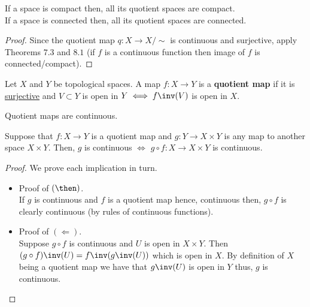 \documentclass[12pt, a4paper]{article}
\begin{document}
\begin{mdprop}
    If a space is compact then, all its quotient spaces are compact. \\
    If a space is connected then, all its quotient spaces are connected.
\end{mdprop}

\begin{proof}
    Since the quotient map \(q : X \to X/\sim\) is continuous and surjective, apply Theorems \(7.3\) and \(8.1\) (if \(f\) is a continuous function then image of \(f\) is connected/compact).
\end{proof}

\begin{definition}
    Let \(X\) and \(Y\) be topological spaces. A map \(f : X \to Y\) is a \textbf{quotient map} if it is \underline{surjective} and \(V \subset Y\) is open in \(Y \iff f\inv(V)\) is open in \(X\).
\end{definition}

\begin{mdremark}
    Quotient maps are continuous.
\end{mdremark}

\begin{mdprop}
    Suppose that \(f : X \to Y\) is a quotient map and \(g :Y \to X \times Y\) is any map to another space \(X \times Y\). Then, \(g\) is continuous \(\iff\) \(g \circ f : X \to X \times Y\) is continuous.
\end{mdprop}

\begin{proof}
    We prove each implication in turn.
    \begin{itemize}
        \item Proof of \((\then)\). \\
        If \(g\) is continuous and \(f\) is a quotient map hence, continuous then, \(g \circ f\) is clearly continuous (by rules of continuous functions).
        \item Proof of \((\Leftarrow)\). \\
        Suppose \(g \circ f\) is continuous and \(U\) is open in \(X \times Y\). Then \((g \circ f)\inv(U) = f\inv(g\inv(U))\) which is open in \(X\). By definition of \(X\) being a quotient map we have that \(g\inv(U)\) is open in \(Y\) thus, \(g\) is continuous.
    \end{itemize}
\end{proof}
\end{document}
